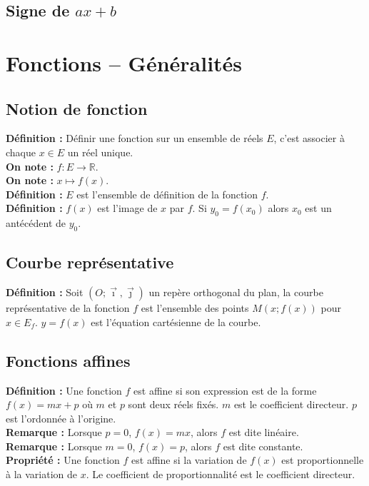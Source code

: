 \documentclass[a4paper,titlepage]{article}
\makeatletter
\let\oldsection\section
\renewcommand\section{\clearpage\oldsection}
\def\tikzscale{1}\begin{lrbox}{\measure@tikzpicture}
\edef\tikzscale{\pgfmathresult}
\makeatother
\begin{document}
    \subsection{Signe de $ax+b$}
        \begin{scaletikzpicturetowidth}{\textwidth}
        \end{scaletikzpicturetowidth}
\section{Fonctions – Généralités}
    \subsection{Notion de fonction}
        \textbf{Définition :} Définir une fonction sur un ensemble de réels $E$, c’est associer à chaque $x\in E$ un réel unique.
        \\
        \textbf{On note :} $f:E\rightarrow\mathbb{R}$.
        \\
        \textbf{On note :} $x\mapsto f\left(x\right)$.
        \\
        \textbf{Définition :} $E$ est l’ensemble de définition de la fonction $f$.
        \\
        \textbf{Définition :} $f\left(x\right)$ est l’image de $x$ par $f$. Si $y_{0}=f\left(x_{0}\right)$ alors $x_{0}$ est un antécédent de $y_{0}$.
    \subsection{Courbe représentative}
        \textbf{Définition :} Soit $\left(O;\vec{\imath},\vec{\jmath}\right)$ un repère orthogonal du plan, la courbe re\-pré\-sen\-ta\-tive de la fonction $f$ est l’ensemble des points $M\left(x;f\left(x\right)\right)$ pour $x\in E_{f}$. $y=f\left(x\right)$ est l’équation cartésienne de la courbe.
    \subsection{Fonctions affines}
        \textbf{Définition :} Une fonction $f$ est affine si son expression est de la forme $f\left(x\right)=mx+p$ où $m$ et $p$ sont deux réels fixés. $m$ est le coefficient directeur. $p$ est l’ordonnée à l’origine.
        \\
        \textbf{Remarque :} Lorsque $p=0$, $f\left(x\right)=mx$, alors $f$ est dite linéaire.
        \\
        \textbf{Remarque :} Lorsque $m=0$, $f\left(x\right)=p$, alors $f$ est dite constante.
        \\
        \textbf{Propriété :} Une fonction $f$ est affine si la variation de $f\left(x\right)$ est proportionnelle à la variation de $x$. Le coefficient de proportionnalité est le coefficient directeur.
\end{document}

